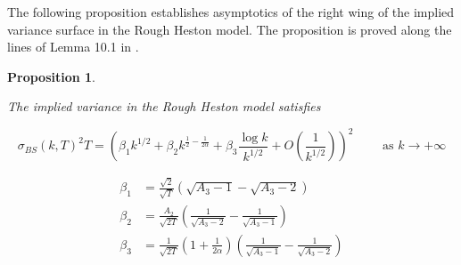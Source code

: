 \documentclass[12pt,twoside]{article}
\theoremstyle{plain}
\theoremstyle{plain}
\newtheorem{proposition}{Proposition}[section]
\theoremstyle{definition}
\theoremstyle{remark}
\numberwithin{equation}{section}
\begin{document}
The following proposition establishes asymptotics of the right wing of the implied variance surface in the Rough Heston model. The proposition is proved along the lines of Lemma 10.1 in \cite{GS09a}.

\begin{proposition}
\label{prop: iv asymptotic}

The implied variance in the Rough Heston model satisfies

\begin{equation}
\label{eq: left wing implied volatility asymptotics}
\sigma_{B S}(k, T)^{2} T=\left(\beta_{1} k^{1 / 2}+\beta_{2} k ^{\frac 12 - \frac{1}{2\alpha}} +\beta_{3} \frac{\log k}{k^{1 / 2}}+O\left(\frac{1}{k^{1 / 2}}\right)\right)^{2} \qquad \text{ as } k\rightarrow +\infty
\end{equation}

$$
\begin{aligned}
\beta_{1} &=\frac{\sqrt{2}}{\sqrt{T}}\left(\sqrt{A_{3}-1}-\sqrt{A_{3}-2}\right) \\[5pt]
\beta_{2} &=\frac{A_{2}}{\sqrt{2 T}}\left(\frac{1}{\sqrt{A_{3}-2}}-\frac{1}{\sqrt{A_{3}-1}}\right) \\[5pt]
\beta_{3}&=\frac{1}{\sqrt{2 T}}\left(1 + \frac{1}{2\alpha}\right)\left(\frac{1}{\sqrt{A_{3}-1}}-\frac{1}{\sqrt{A_{3}-2}}\right)
\end{aligned}
$$

\end{proposition}
\end{document}
